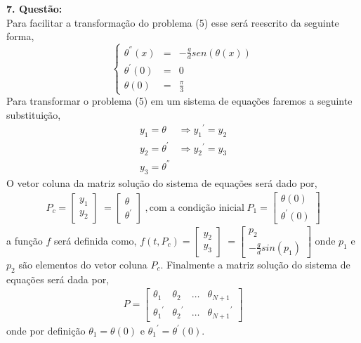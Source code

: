 \documentclass[a4paper,12pt]{article}
\begin{document}
\textbf{7. Quest\~ao:}\\
Para facilitar a transforma\c c\~ao do problema (5) esse ser\'a reescrito da seguinte forma, 
\[\left \{
	\begin{array}{ccc}
	{\theta}^{''}(x)& = & -\frac{g}{d} sen(\theta(x)) \\
	{\theta}^{'}(0) &  = & 0 \\
	{\theta}(0) &= & \frac{\pi}{3} 
\end{array}
\right .
 \]
Para transformar o problema (5) em um sistema de equa\c c\~oes faremos a seguinte substitui\c c\~ao,
\begin{align*}
	y_1 = \theta \hspace{3pt} & \Rightarrow  {y_1}^{'} = y_2\\
	y_2 = {\theta}^{'} & \Rightarrow  {y_2}^{'} = y_3 \\
	y_3 = {\theta}^{''} & 
\end{align*}
O vetor coluna da matriz solu\c c\~ao do sistema de equa\c c\~oes ser\'a dado por, 
\begin{align*}
	P_c  =  \left [ 
		\begin{array}{c}
			y_1 \\	
			{y_2}	
		\end{array}
	\right ] \hspace{3pt} =\left [ 
		\begin{array}{c}
			\theta \\	
			{\theta}^{'} 	
		\end{array}
	\right ]\hspace{3pt}, \textrm{com a condi\c c\~ao inicial} \hspace{3pt}P_1 =\left [
		\begin{array}{c}	
			\theta (0) \\
			{\theta}^{'} (0)
		\end{array} 
	\right ]   
\end{align*}
a fun\c c\~ao $f$ ser\'a definida como,
$f(t,P_c)=  \left [ 
		\begin{array}{c}
			y_2 \\	
			{y_3}	
		\end{array}
	\right ] \hspace{3pt} =\left [\begin{array}{c}
		p_2 \\
		-\frac{g}{d} sin (p_1)
	\end{array}
\right ] $ onde $p_1$ e $p_2$ s\~ao elementos do vetor coluna $P_c$.
Finalmente a matriz solu\c c\~ao do sistema de  equa\c c\~oes ser\'a dada por,
\begin{align*}
	P =\left [
		\begin{array}{cccc}
			{\theta}_1 & {\theta}_2 & \dots & {\theta}_{N+1} \\
			{{\theta}_1}^{'}& {{\theta}_2}^{'} & \dots & {{\theta}_{N+1}}^{'}
		\end{array}
	\right ] 
\end{align*}
onde por defini\c c\~ao $ {\theta}_1 = \theta (0)$ e ${{\theta}_1}^{'} = {\theta}^{'} (0)$.
\end{document}
